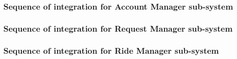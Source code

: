 \documentclass[a4paper,11pt]{report} %
\begin{document}
		\subsubsection{Sequence of integration for Account Manager sub-system} \label{sec:2.4.1}
			\begin{minipage}{\linewidth}
			\end{minipage}
			
		\subsubsection{Sequence of integration for Request Manager sub-system} \label{sec:2.4.2}
		\begin{minipage}{\linewidth}
		\end{minipage}
		
		\subsubsection{Sequence of integration for Ride Manager sub-system} \label{sec:2.4.3}
		\begin{minipage}{\linewidth}
		\end{minipage}
		
\end{document}

